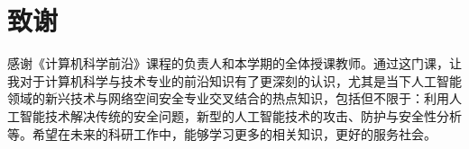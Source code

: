 \documentclass[lettersize,journal]{IEEEtran}
\begin{document}
\section{致谢}
感谢《计算机科学前沿》课程的负责人和本学期的全体授课教师。通过这门课，让我对于计算机科学与技术专业的前沿知识有了更深刻的认识，尤其是当下人工智能领域的新兴技术与网络空间安全专业交叉结合的热点知识，包括但不限于：利用人工智能技术解决传统的安全问题，新型的人工智能技术的攻击、防护与安全性分析等。希望在未来的科研工作中，能够学习更多的相关知识，更好的服务社会。







%
%

\vspace{11pt}

\vfill
\end{document}

